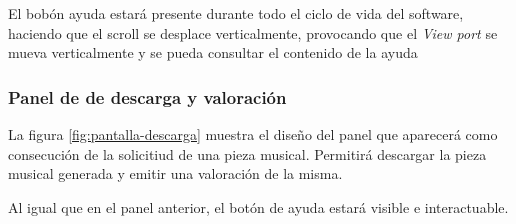 El bobón ayuda estará presente durante todo el ciclo de vida del software, haciendo que el scroll se desplace verticalmente, provocando que el \emph{View port} se mueva verticalmente y se pueda consultar el contenido de la ayuda
 
\subsubsection{Panel de de descarga y valoración}

La figura \ref{fig:pantalla-descarga} muestra el diseño del panel que aparecerá como consecución de la solicitiud de una pieza musical. Permitirá descargar la pieza musical generada y emitir una valoración de la misma.


Al igual que en el panel anterior, el botón de ayuda estará visible e interactuable.

